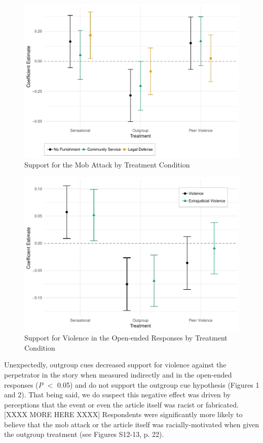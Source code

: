 \documentclass[12pt, letterpaper]{article}
\begin{document}
\begin{figure}[!htbp]
  \centering
  \caption{Support for the Mob Attack by Treatment Condition}
  \includegraphics[width=.835\textwidth]{figures/ATE_punish_mob_outcomes.pdf}
\end{figure}

\begin{figure}[!htbp]
  \centering
  \caption{Support for Violence in the Open-ended Responses by Treatment Condition}
  \includegraphics[width=.835\textwidth]{figures/ATE_oe.pdf}
\end{figure}

Unexpectedly, outgroup cues decreased support for violence against the perpetrator in the story when measured indirectly and in the open-ended responses (\textit{P} $<$ 0.05) and do not support the outgroup cue hypothesis (Figures 1 and 2). That being said, we do suspect this negative effect was driven by perceptions that the event or even the article itself was racist or fabricated.[XXXX MORE HERE XXXX] Respondents were significantly more likely to believe that the mob attack or the article itself was racially-motivated when given the outgroup treatment (see Figures S12-13, p. 22).
\end{document}
